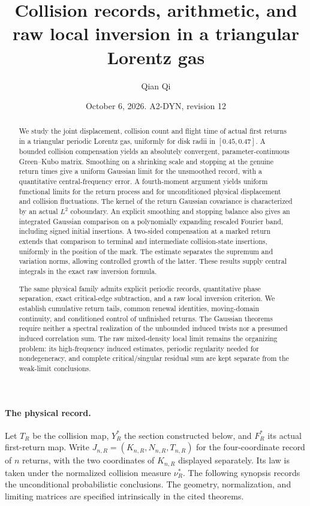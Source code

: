 \documentclass[11pt,reqno]{amsart}
\title[Collision records and raw local inversion]{Collision records, arithmetic, and raw local inversion in a triangular Lorentz gas}
\author{Qian Qi}
\date{October 6, 2026. A2-DYN, revision 12}
\numberwithin{equation}{section}
\theoremstyle{definition}\newtheorem{definition}[theorem]{Definition}
\theoremstyle{remark}\newtheorem{remark}[theorem]{Remark}
\begin{document}
\raggedbottom
\begin{abstract}
We study the joint displacement, collision count and flight time of
actual first returns in a triangular periodic Lorentz gas, uniformly
for disk radii in $[0.45,0.47]$. A bounded collision compensation yields
an absolutely convergent, parameter-continuous Green--Kubo matrix.
Smoothing on a shrinking scale and stopping at the genuine return
times give a uniform Gaussian limit for the unsmoothed record, with a
quantitative central-frequency error. A fourth-moment argument yields
uniform functional limits for the return process and for unconditioned
physical displacement and collision fluctuations. The kernel of the
return Gaussian covariance is characterized by an actual $L^2$
coboundary. An explicit smoothing and stopping balance also gives
an integrated Gaussian comparison on a polynomially expanding rescaled
Fourier band, including signed initial insertions. A two-sided compensation at a
marked return extends that comparison to terminal and intermediate
collision-state insertions, uniformly in the position of the mark.
The estimate separates the supremum and variation norms, allowing
controlled growth of the latter. These results supply central integrals
in the exact raw inversion formula.

The same physical family admits explicit periodic records, quantitative
phase separation, exact critical-edge subtraction, and a raw local
inversion criterion. We establish cumulative return tails, common
renewal identities, moving-domain continuity, and conditioned control
of unfinished returns. The Gaussian theorems require neither a spectral
realization of the unbounded induced twists nor a presumed induced
correlation sum. The raw mixed-density local limit remains the organizing
problem: its high-frequency induced estimates, periodic regularity
needed for nondegeneracy, and complete critical/singular residual sum
are kept separate from the weak-limit conclusions.
\end{abstract}
\maketitle

\paragraph{The physical record.}
Let $T_R$ be the collision map, $Y_R^*$ the section constructed below,
and $F_R^*$ its actual first-return map. Write
$J_{n,R}=(K_{n,R},N_{n,R},T_{n,R})$ for the four-coordinate record of
$n$ returns, with the two coordinates of $K_{n,R}$ displayed separately.
Its law is taken under the normalized collision measure $\nu_R^*$.
The following synopsis records the unconditional probabilistic
conclusions. The geometry, normalization, and limiting matrices are
specified intrinsically in the cited theorems.
\end{document}
